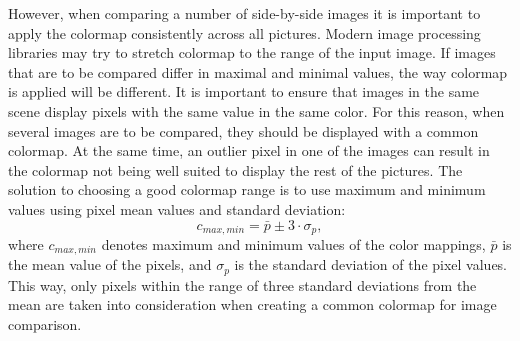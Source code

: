 However, when comparing a number of side-by-side images it is important to apply the colormap consistently across all pictures.
Modern image processing libraries may try to stretch colormap to the range of the input image.
If images that are to be compared differ in maximal and minimal values, the way colormap is applied will be different.
It is important to ensure that images in the same scene display pixels with the same value in the same color.
For this reason, when several images are to be compared, they should be displayed with a common colormap.
At the same time, an outlier pixel in one of the images can result in the colormap not being well suited to display the rest of the pictures.
The solution to choosing a good colormap range is to use maximum and minimum values using pixel mean values and standard deviation:
\[ c_{max,min} = \bar{p} \pm 3 \cdot \sigma_p, \]
where $ c_{max,min} $ denotes maximum and minimum values of the color mappings, $ \bar{p} $ is the mean value of the pixels, and $ \sigma_p $ is the standard deviation of the pixel values.
This way, only pixels within the range of three standard deviations from the mean are taken into consideration when creating a common colormap for image comparison.